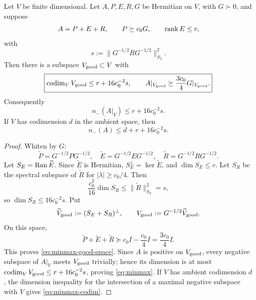 \begin{lemma}
\label{lem:minmax}
Let $V$ be finite dimensional. Let $A,P,E,R,G$ be Hermitian on $V$, with
$G\succ0$, and suppose
\[
A=P+E+R,
\qquad
P\succeq c_0G,
\qquad
\operatorname{rank} E\le r,
\]
with
\[
s:=\|G^{-1/2}RG^{-1/2}\|_{S_2}^2.
\]
Then there is a subspace $V_{\rm good}\subset V$ with
\begin{equation}
\boxed{
\operatorname{codim}_VV_{\rm good}\le r+16c_0^{-2}s,
\qquad
A|_{V_{\rm good}}\succeq\frac{3c_0}{4}G|_{V_{\rm good}}.
}
\label{eq:minmax-good-space}
\end{equation}
Consequently
\begin{equation}
\boxed{n_-(A|_V)\le r+16c_0^{-2}s.}
\label{eq:minmax}
\end{equation}
If $V$ has codimension $d$ in the ambient space, then
\begin{equation}
\boxed{n_-(A)\le d+r+16c_0^{-2}s.}
\label{eq:minmax-codim}
\end{equation}
\end{lemma}

\begin{proof}
Whiten by $G$:
\[
\widetilde P=G^{-1/2}PG^{-1/2},
\quad
\widetilde E=G^{-1/2}EG^{-1/2},
\quad
\widetilde R=G^{-1/2}RG^{-1/2}.
\]
Let $S_E=\operatorname{Ran}\widetilde E$. Since $\widetilde E$ is Hermitian,
$S_E^\perp=\ker\widetilde E$, and $\dim S_E\le r$. Let $S_R$ be the spectral
subspace of $\widetilde R$ for $|\lambda|\ge c_0/4$. Then
\[
\frac{c_0^2}{16}\dim S_R\le\|\widetilde R\|_{S_2}^2=s,
\]
so $\dim S_R\le16c_0^{-2}s$. Put
\[
\widetilde V_{\rm good}:=(S_E+S_R)^\perp,
\qquad
V_{\rm good}:=G^{-1/2}\widetilde V_{\rm good}.
\]
On this space,
\[
\widetilde P+\widetilde E+\widetilde R
\succeq c_0I-\frac{c_0}{4}I
=\frac{3c_0}{4}I.
\]
This proves \eqref{eq:minmax-good-space}. Since $A$ is positive on
$V_{\rm good}$, every negative subspace of $A|_V$ meets $V_{\rm good}$
trivially; hence its dimension is at most
$\operatorname{codim}_VV_{\rm good}\le r+16c_0^{-2}s$, proving \eqref{eq:minmax}.
If $V$ has ambient codimension $d$, the dimension inequality for the
intersection of a maximal negative subspace with $V$ gives
\eqref{eq:minmax-codim}.
\end{proof}
